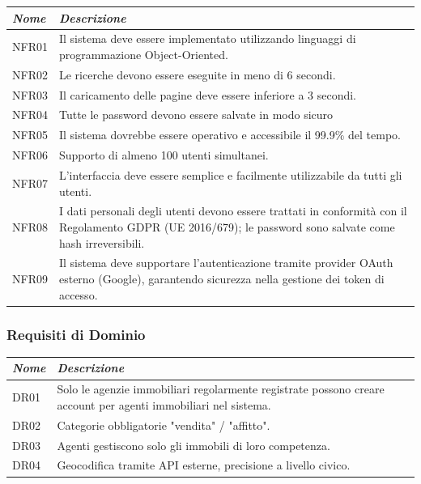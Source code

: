 \documentclass[a4paper,11pt]{article}
\begin{document}
\begin{table}[h]
\centering
\begin{tabularx}{\textwidth}{|l|X|}
\hline
\rowcolor[HTML]{010066} 
{\color[HTML]{EFEFEF} \textit{\textbf{Nome}}} & {\color[HTML]{FFFFFF} \textit{\textit{Descrizione}}} \\ \hline
NFR01  &Il sistema deve essere implementato utilizzando linguaggi di programmazione 
Object-Oriented. \\ \hline
NFR02  & Le ricerche devono essere eseguite in meno di 6 secondi. \\ \hline
NFR03 &Il caricamento delle pagine deve essere inferiore a 3 secondi.  \\ \hline
NFR04 & Tutte le password devono essere salvate in modo sicuro \\ \hline
NFR05 & Il sistema dovrebbe essere operativo e accessibile il 99.9\% del tempo. \\ \hline
NFR06 & Supporto di almeno 100 utenti simultanei.\\ \hline
NFR07 & L’interfaccia deve essere semplice e facilmente utilizzabile da tutti gli utenti.\\ \hline
NFR08 & I dati personali degli utenti devono essere trattati in conformità con il Regolamento GDPR (UE 2016/679); le password sono salvate come hash irreversibili. \\ \hline
NFR09 & Il sistema deve supportare l’autenticazione tramite provider OAuth esterno (Google), garantendo sicurezza nella gestione dei token di accesso. \\ \hline

\end{tabularx}
\end{table}
\subsubsection{Requisiti di Dominio}

\begin{table}[h]
\centering
\begin{tabularx}{\textwidth}{|l|X|}
\hline
\rowcolor[HTML]{010066} 
{\color[HTML]{EFEFEF} \textit{\textbf{Nome}}} & {\color[HTML]{FFFFFF} \textit{\textit{Descrizione}}} \\ \hline
DR01  &Solo le agenzie immobiliari regolarmente registrate possono creare account per 
agenti immobiliari nel sistema.  \\ \hline
DR02  &Categorie obbligatorie "vendita" / "affitto".  \\ \hline
DR03  &Agenti gestiscono solo gli immobili di loro competenza.  \\ \hline
DR04  &Geocodifica tramite API esterne, precisione a livello civico.  \\ \hline

\end{tabularx}
\end{table}
\end{document}
